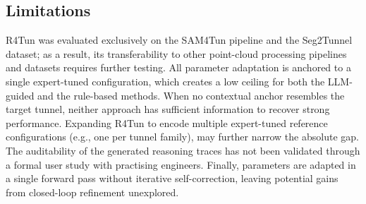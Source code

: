 \documentclass[a4paper,fleqn]{cas-dc}
\begin{document}
{%


\subsection{Limitations}\label{sec:limitations}

R4Tun was evaluated exclusively on the SAM4Tun pipeline and the Seg2Tunnel dataset; as a result, its transferability to other point-cloud processing pipelines and datasets requires further testing. All parameter adaptation is anchored to a single expert-tuned configuration, which creates a low ceiling for both the LLM-guided and the rule-based methods. When no contextual anchor resembles the target tunnel, neither approach has sufficient information to recover strong performance. Expanding R4Tun to encode multiple expert-tuned reference configurations (e.g., one per tunnel family), may further narrow the absolute gap. The auditability of the generated reasoning traces has not been validated through a formal user study with practising engineers. Finally, parameters are adapted in a single forward pass without iterative self-correction, leaving potential gains from closed-loop refinement unexplored.

}
\end{document}
